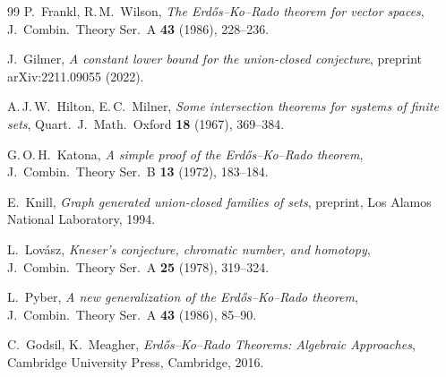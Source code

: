 \documentclass[12pt,a4paper]{amsart}
\theoremstyle{definition}
\theoremstyle{remark}
\begin{document}
\begin{thebibliography}{99}
P.~Frankl, R.\,M.~Wilson,
\textit{The Erdős--Ko--Rado theorem for vector spaces},
J.\ Combin.\ Theory Ser.\ A \textbf{43} (1986), 228--236.

J.~Gilmer,
\textit{A constant lower bound for the union-closed conjecture},
preprint arXiv:2211.09055 (2022).

A.\,J.\,W.~Hilton, E.\,C.~Milner,
\textit{Some intersection theorems for systems of finite sets},
Quart.\ J.\ Math.\ Oxford \textbf{18} (1967), 369--384.

G.\,O.\,H.~Katona,
\textit{A simple proof of the Erdős--Ko--Rado theorem},
J.\ Combin.\ Theory Ser.\ B \textbf{13} (1972), 183--184.

E.~Knill,
\textit{Graph generated union-closed families of sets},
preprint, Los Alamos National Laboratory, 1994.

L.~Lov\'asz,
\textit{Kneser's conjecture, chromatic number, and homotopy},
J.\ Combin.\ Theory Ser.\ A \textbf{25} (1978), 319--324.

L.~Pyber,
\textit{A new generalization of the Erdős--Ko--Rado theorem},
J.\ Combin.\ Theory Ser.\ A \textbf{43} (1986), 85--90.

C.~Godsil, K.~Meagher,
\textit{Erd\H{o}s--Ko--Rado Theorems: Algebraic Approaches},
Cambridge University Press, Cambridge, 2016.

\end{thebibliography}
\end{document}
